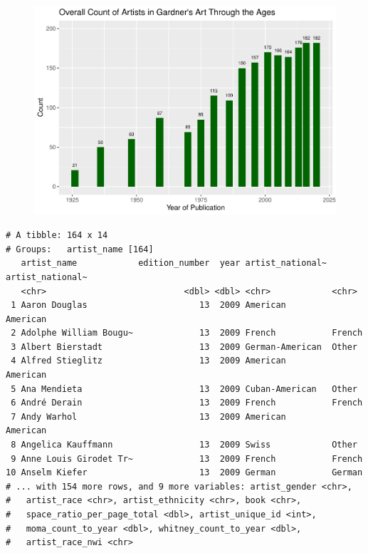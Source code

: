 \documentclass[
  letterpaper,
  DIV=11,
  numbers=noendperiod]{scrreprt}
\begin{document}
\begin{figure}

{\centering \includegraphics{Chapter1/Chapter1_files/figure-pdf/gardnercountthroughtime-1.pdf}

}

\end{figure}

\begin{verbatim}
# A tibble: 164 x 14
# Groups:   artist_name [164]
   artist_name            edition_number  year artist_national~ artist_national~
   <chr>                           <dbl> <dbl> <chr>            <chr>           
 1 Aaron Douglas                      13  2009 American         American        
 2 Adolphe William Bougu~             13  2009 French           French          
 3 Albert Bierstadt                   13  2009 German-American  Other           
 4 Alfred Stieglitz                   13  2009 American         American        
 5 Ana Mendieta                       13  2009 Cuban-American   Other           
 6 André Derain                       13  2009 French           French          
 7 Andy Warhol                        13  2009 American         American        
 8 Angelica Kauffmann                 13  2009 Swiss            Other           
 9 Anne Louis Girodet Tr~             13  2009 French           French          
10 Anselm Kiefer                      13  2009 German           German          
# ... with 154 more rows, and 9 more variables: artist_gender <chr>,
#   artist_race <chr>, artist_ethnicity <chr>, book <chr>,
#   space_ratio_per_page_total <dbl>, artist_unique_id <int>,
#   moma_count_to_year <dbl>, whitney_count_to_year <dbl>,
#   artist_race_nwi <chr>
\end{verbatim}
\end{document}
